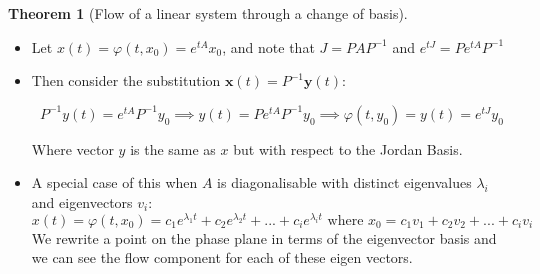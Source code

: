 \documentclass{article}
\newtheorem{thm}{Theorem}[section]
\begin{document}
\begin{thm}[Flow of a linear system through a change of basis]
\end{thm}
\begin{itemize}
    \item Let $ x(t) = \varphi(t, {x_0})= e^{tA} x_0$, and note that $J = PAP^{-1}$ and  $e^{tJ} = Pe^{tA}P^{-1}$
    
    \item Then consider the substitution $\mathbf{x}(t) = P^{-1} \mathbf{y}(t)$:

    \[P^{-1}y(t) = e^{tA}P^{-1} y_0 \implies y(t) = Pe^{tA}P^{-1} y_0 \implies {\varphi}(t, y_0) = y(t) = e^{tJ}y_0\]

    Where vector $y$ is the same as $x$ but with respect to the Jordan Basis.

    \item A special case of this when $A$ is diagonalisable with distinct eigenvalues $\lambda_i$ and eigenvectors $v_i$:
    \[x(t) = {\varphi}(t, x_0) = c_1e^{\lambda_1 t} + c_2e^{\lambda_2 t} + ... + c_ie^{\lambda_i t} \text{ where $x_0 = c_1v_1 + c_2v_2 + ... + c_iv_i$}\]
    We rewrite a point on the phase plane in terms of the eigenvector basis and we can see the flow component for each of these eigen vectors.
    
\end{itemize}
\end{document}
